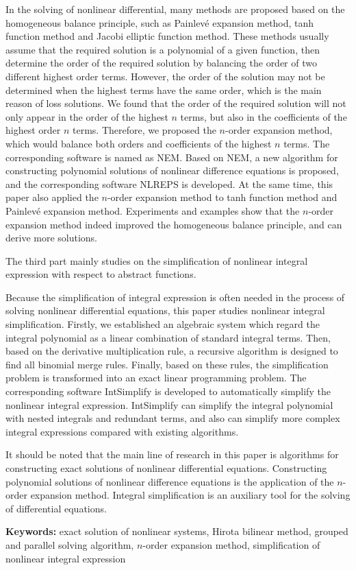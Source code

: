 In the solving of nonlinear differential, many methods are proposed based on the  homogeneous balance principle, such as Painlevé expansion method, tanh function method  and Jacobi elliptic function method. 
These methods usually assume that the required solution is a polynomial of a given function, then determine the order of the required solution by balancing the order of two different highest order terms. 
However, the order of the solution may not be determined when the highest terms have the same order, which is the main reason of loss solutions. 
We found that the order of the required solution will not only appear in the order of the highest $n$ terms, but also in the coefficients of the highest order $n$ terms. 
Therefore, we proposed the $n$-order expansion method, which would balance both orders and coefficients of the highest $n$ terms. The corresponding software is named as NEM. 
Based on NEM, a new algorithm for constructing polynomial solutions of  nonlinear difference equations is proposed, and the corresponding software NLREPS is developed. 
At the same time, this paper also applied the $n$-order expansion method to tanh function method  and Painlevé expansion method. 
Experiments and examples show that the $n$-order expansion method indeed improved the homogeneous balance principle, and can derive more solutions.

The third part mainly studies on the simplification of nonlinear integral expression with respect to abstract functions.

Because the simplification of integral expression is often needed in the process of solving nonlinear differential equations, this paper studies nonlinear integral simplification. Firstly, we established an algebraic system which  regard the integral polynomial as a linear combination of standard integral terms. Then, based on the derivative multiplication rule, a recursive algorithm is designed to find all binomial merge rules. Finally, based on these rules, the simplification problem is transformed into an exact linear programming problem. The corresponding software  IntSimplify is developed to automatically simplify the nonlinear integral expression. IntSimplify can simplify the integral polynomial with nested integrals and redundant terms, and also can simplify more complex integral expressions compared with existing algorithms.

It should be noted that the main line of research in this paper is algorithms for constructing exact solutions of nonlinear differential equations. Constructing polynomial solutions of nonlinear difference equations is the application of the $n$-order expansion method. Integral simplification is an auxiliary tool for the solving of differential equations.

\bigskip
\noindent\textbf{ Keywords:}
exact solution of nonlinear systems, Hirota bilinear method, grouped and parallel solving algorithm, $n$-order expansion method, simplification of nonlinear integral expression
